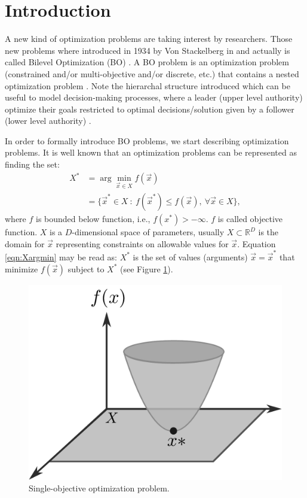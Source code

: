 \documentclass[conference]{IEEEtran}
\begin{document}
\IEEEpeerreviewmaketitle


\section{Introduction}

A new kind of optimization problems are taking interest by researchers.
Those new problems where introduced in 1934 by Von Stackelberg in \cite{von2010market} 
and actually is called Bilevel Optimization (BO) . A BO problem is an optimization
problem (constrained and/or multi-objective and/or discrete, etc.) that contains
a nested optimization problem \cite{bard2013practical,dempe2002foundations}.
Note the hierarchal structure introduced which can be useful to model decision-making
processes, where a leader (upper level authority) optimize their goals restricted to
optimal decisions/solution given by a follower (lower level authority)
\cite{brotcorne2001bilevel,kalashnikov2010comparison,sinha2015transportation,von1945theory,wang2014bilevel}.

In order to formally introduce BO problems, we start describing optimization problems.
It is well known that an optimization problems can be represented as finding the set:
% 
\begin{align}
    \label{eqn:Xargmin}
    X^* &= \arg \min_{\vec{x} \in X} f(\vec{x}) \\ \nonumber
    &= \{ \vec{x}^* \in X \ : \ f(\vec{x}^*) \leq f( \vec{x} ), \ 
    \forall
    \vec{x} \in X \},
\end{align}
% 
where $f$ is bounded below function, i.e., $f(x^*) > -\infty$. $f$ is called objective
function. $X$ is a $D$-dimensional space of parameters, usually $X \subset \mathbb{R}^D$
is the domain for $\vec{x}$ representing constraints on allowable values for $\vec{x}$.
Equation \ref{eqn:Xargmin} may be read as: $X^*$ is the set of values (arguments)
$\vec{x} = \vec{x}^*$ that minimize $f(\vec{x})$ subject to $X^*$ (see Figure \ref{fig:single-level}).

% 
\begin{figure}[!ht]
    \centering
    \includegraphics[width=0.5\linewidth]{img/monolevel.pdf}
    \caption{Single-objective optimization problem.}
    \label{fig:single-level}
\end{figure}
\end{document}
